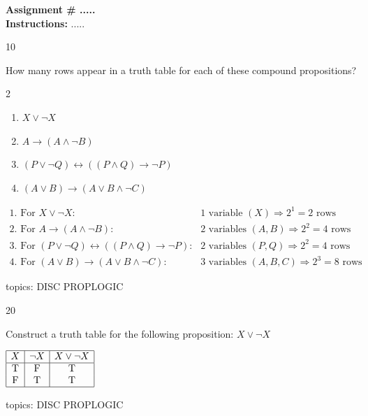 \documentclass[12pt]{article}
\begin{document}
\noindent
{\textbf{Assignment \# .....}}\\

\noindent
{\bf Instructions:} .....




\begin{enumerate}

 \ex
{}{10}
{ 
 How many rows appear in a truth table for each of these
compound propositions?

\begin{multicols}{2}
\begin{enumerate}

\item $X \lor \neg X$

\item $A \rightarrow (A \land \neg B)$

\item $(P \lor \neg Q) \leftrightarrow ( (P \land Q) \rightarrow \neg P)$

\item $(A \lor B) \rightarrow (A \lor B \land \neg C)$

\end{enumerate}
\end{multicols}


}{

 


\begin{align*}
\text{1. For } X \lor \neg X:& \quad \text{1 variable } (X) \Rightarrow 2^1 = 2 \text{ rows} \\
\text{2. For } A \rightarrow (A \land \neg B):& \quad \text{2 variables } (A, B) \Rightarrow 2^2 = 4 \text{ rows} \\
\text{3. For } (P \lor \neg Q) \leftrightarrow ( (P \land Q) \rightarrow \neg P):& \quad \text{2 variables } (P, Q) \Rightarrow 2^2 = 4 \text{ rows} \\
\text{4. For } (A \lor B) \rightarrow (A \lor B \land \neg C):& \quad \text{3 variables } (A, B, C) \Rightarrow 2^3 = 8 \text{ rows}
\end{align*}

}{}{topics: DISC PROPLOGIC}


 \ex
{}{20}
{ 
 Construct a truth table for the following proposition:
$X \lor \neg X$


}{

 
$
\begin{array}{|c|c|c|}
\hline
X & \neg X & X \lor \neg X \\
\hline
\text{T} & \text{F} & \text{T} \\
\text{F} & \text{T} & \text{T} \\
\hline
\end{array}
$
}{}{topics: DISC PROPLOGIC}




\end{enumerate}
\end{document}
